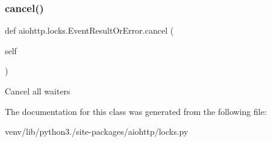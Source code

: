 \subsubsection{\texorpdfstring{cancel()}{cancel()}}
{\footnotesize\ttfamily def aiohttp.\+locks.\+Event\+Result\+Or\+Error.\+cancel (\begin{DoxyParamCaption}\item[{}]{self }\end{DoxyParamCaption})}

\begin{DoxyVerb}Cancel all waiters \end{DoxyVerb}
 

The documentation for this class was generated from the following file\+:\begin{DoxyCompactItemize}
\item 
venv/lib/python3./site-\/packages/aiohttp/locks.\+py\end{DoxyCompactItemize}

